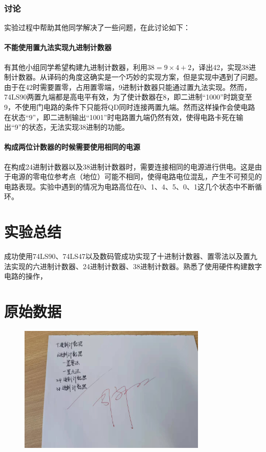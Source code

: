 \documentclass[UTF8]{ctexart}
\numberwithin{figure}{subsection}
\numberwithin{table}{subsection}
\numberwithin{equation}{subsection}
\begin{document}
\subsubsection{讨论}
实验过程中帮助其他同学解决了一些问题，在此讨论如下：
\paragraph{不能使用置九法实现九进制计数器} 有其他小组同学希望构建九进制计数器，利用\(38 = 9 \times 4 + 2\)，译出42，实现38进制计数器。从译码的角度这确实是一个巧妙的实现方案，但是实现中遇到了问题。由于在42时需要置零，占用置零端，9进制计数器只能通过置九法实现。然而，74LS90两置九端都是高电平有效，为了使计数器在8，即二进制“1000”时跳变至9，不使用门电路的条件下只能将QD同时连接两置九端。然而这样操作会使电路在状态“9”，即二进制输出“1001”时电路置九端仍然有效，使得电路卡死在输出“9”的状态，无法实现38进制的功能。
\paragraph{构成两位计数器的时候需要使用相同的电源} 在构成24进制计数器以及38进制计数器时，需要连接相同的电源进行供电。这是由于电源的零电位参考点（地位）可能不相同，使得电路电位混乱，产生不可预见的电路表现。实验中遇到的情况为电路高位在0、1、4、5、0、1这几个状态中不断循环。


\section{实验总结}

成功使用74LS90、74LS47以及数码管成功实现了十进制计数器、置零法以及置九法实现的六进制计数器、24进制计数器、38进制计数器。熟悉了使用硬件构建数字电路的操作，

\section*{原始数据}


\begin{figure}[H]
    \begin{center}
        \includegraphics[width=0.8\textwidth]{sign.jpg}
    \end{center}
\end{figure}
\end{document}
